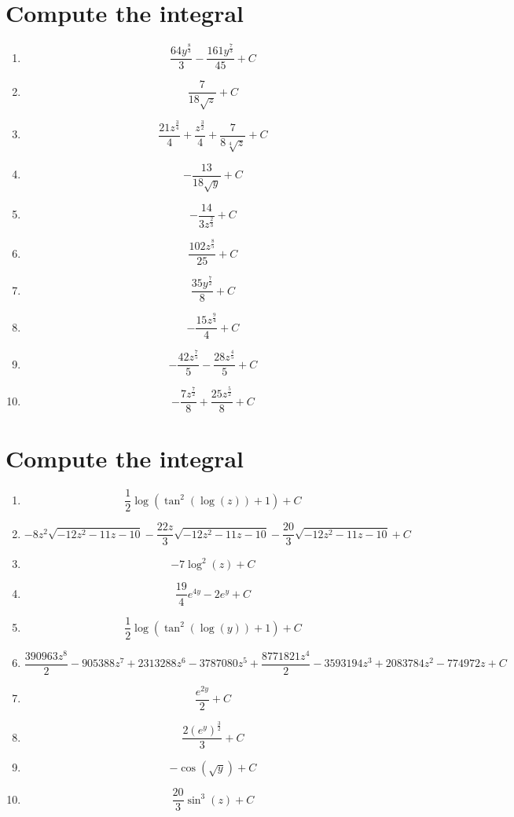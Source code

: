 \documentclass{article}
\begin{document}
        \section{Compute the integral}
        
        \begin{enumerate}
        \item$$\frac{64 y^{\frac{8}{3}}}{3} - \frac{161 y^{\frac{7}{3}}}{45} + C $$
\item$$\frac{7}{18 \sqrt{z}} + C $$
\item$$\frac{21 z^{\frac{3}{4}}}{4} + \frac{z^{\frac{3}{2}}}{4} + \frac{7}{8 \sqrt[4]{z}} + C $$
\item$$- \frac{13}{18 \sqrt{y}} + C $$
\item$$- \frac{14}{3 z^{\frac{2}{3}}} + C $$
\item$$\frac{102 z^{\frac{8}{5}}}{25} + C $$
\item$$\frac{35 y^{\frac{7}{2}}}{8} + C $$
\item$$- \frac{15 z^{\frac{9}{4}}}{4} + C $$
\item$$- \frac{42 z^{\frac{7}{5}}}{5} - \frac{28 z^{\frac{4}{5}}}{5} + C $$
\item$$- \frac{7 z^{\frac{7}{2}}}{8} + \frac{25 z^{\frac{5}{2}}}{8} + C $$
        \end{enumerate}
        

        \section{Compute the integral}
        
        \begin{enumerate}
        \item$$\frac{1}{2} \log{\left (\tan^{2}{\left (\log{\left (z \right )} \right )} + 1 \right )} + C $$
\item$$- 8 z^{2} \sqrt{- 12 z^{2} - 11 z - 10} - \frac{22 z}{3} \sqrt{- 12 z^{2} - 11 z - 10} - \frac{20}{3} \sqrt{- 12 z^{2} - 11 z - 10} + C $$
\item$$- 7 \log^{2}{\left (z \right )} + C $$
\item$$\frac{19}{4} e^{4 y} - 2 e^{y} + C $$
\item$$\frac{1}{2} \log{\left (\tan^{2}{\left (\log{\left (y \right )} \right )} + 1 \right )} + C $$
\item$$\frac{390963 z^{8}}{2} - 905388 z^{7} + 2313288 z^{6} - 3787080 z^{5} + \frac{8771821 z^{4}}{2} - 3593194 z^{3} + 2083784 z^{2} - 774972 z + C $$
\item$$\frac{e^{2 y}}{2} + C $$
\item$$\frac{2 \left(e^{y}\right)^{\frac{3}{2}}}{3} + C $$
\item$$- \cos{\left (\sqrt{y} \right )} + C $$
\item$$\frac{20}{3} \sin^{3}{\left (z \right )} + C $$
        \end{enumerate}
        

    
\end{document}
